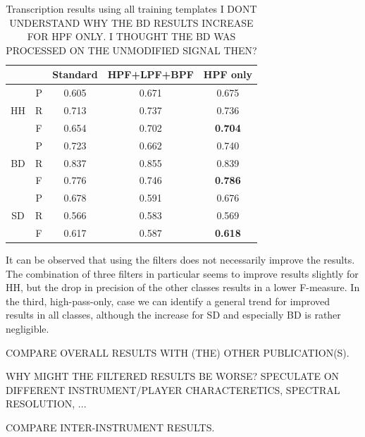\documentclass{article}
\begin{document}
\begin{table}[h]
\begin{center}
\begin{tabular}{|c|c|c|c|c|}
\hline
\multicolumn{2}{|c|}{}  & Standard & HPF+LPF+BPF & HPF only \\ \hline
\multirow{3}{*}{HH} & P & 0.605    & 0.671       & 0.675    \\ \cline{2-5} 
                    & R & 0.713    & 0.737       & 0.736    \\ \cline{2-5} 
                    & F & 0.654    & 0.702       & \textbf{0.704}    \\ \hline
\multirow{3}{*}{BD} & P & 0.723    & 0.662       & 0.740    \\ \cline{2-5} 
                    & R & 0.837    & 0.855       & 0.839    \\ \cline{2-5} 
                    & F & 0.776    & 0.746       & \textbf{0.786}    \\ \hline
\multirow{3}{*}{SD} & P & 0.678    & 0.591       & 0.676    \\ \cline{2-5} 
                    & R & 0.566    & 0.583       & 0.569    \\ \cline{2-5} 
                    & F & 0.617    & 0.587       & \textbf{0.618}    \\ \hline
\end{tabular}
\end{center}
 \caption{Transcription results using all training templates I DONT UNDERSTAND WHY THE BD RESULTS INCREASE FOR HPF ONLY. I THOUGHT THE BD WAS PROCESSED ON THE UNMODIFIED SIGNAL THEN?}
 \label{tab:basicResults}
\end{table}

It can be observed that using the filters does not necessarily improve the results. The combination of three filters in particular seems to improve results slightly for HH, but the drop in precision of the other classes results in a lower F-measure. In the third, high-pass-only, case we can identify a general trend for improved results in all classes, although the increase for SD and especially BD is rather negligible.

COMPARE OVERALL RESULTS WITH (THE) OTHER PUBLICATION(S).

WHY MIGHT THE FILTERED RESULTS BE WORSE? SPECULATE ON DIFFERENT INSTRUMENT/PLAYER CHARACTERETICS, SPECTRAL RESOLUTION, ...

COMPARE INTER-INSTRUMENT RESULTS.
\end{document}
